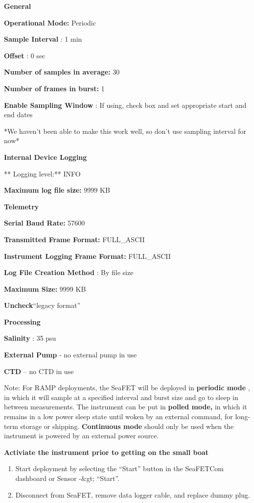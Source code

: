 \documentclass[]{book}
\providecommand{\tightlist}{%
  \setlength{\itemsep}{0pt}\setlength{\parskip}{0pt}}
\begin{document}
\textbf{General}

\textbf{Operational Mode:} Periodic

\textbf{Sample Interval} : 1 min

\textbf{Offset} : 0 sec

\textbf{Number of samples in average:} 30

\textbf{Number of frames in burst:} 1

\textbf{Enable Sampling Window} : If using, check box and set
appropriate start and end dates

*We haven't been able to make this work well, so don't use sampling
interval for now*

\textbf{Internal Device Logging}

** Logging level:** INFO

\textbf{Maximum log file size:} 9999 KB

\textbf{Telemetry}

\textbf{Serial Baud Rate:} 57600

\textbf{Transmitted Frame Format:} FULL\_ASCII

\textbf{Instrument Logging Frame Format:} FULL\_ASCII

\textbf{Log File Creation Method} : By file size

\textbf{Maximum Size:} 9999 KB

\textbf{Uncheck}``legacy format''

\textbf{Processing}

\textbf{Salinity} : 35 psu

\textbf{External Pump} - no external pump in use

\textbf{CTD} -- no CTD in use

Note: For RAMP deployments, the SeaFET will be deployed in
\textbf{periodic mode} , in which it will sample at a specified interval
and burst size and go to sleep in between measurements. The instrument
can be put in \textbf{polled mode,} in which it remains in a low power
sleep state until woken by an external command, for long-term storage or
shipping. \textbf{Continuous mode} should only be used when the
instrument is powered by an external power source.

\textbf{Activiate the instrument prior to getting on the small boat}

\begin{enumerate}
\def\labelenumi{\arabic{enumi}.}
\tightlist
\item
  Start deployment by selecting the ``Start'' button in the SeaFETCom
  dashboard or Sensor -\&gt; ``Start''.
\item
  Disconnect from SeaFET, remove data logger cable, and replace dummy
  plug.
\end{enumerate}
\end{document}
